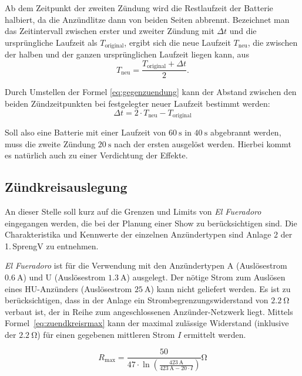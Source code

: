 \documentclass[paper=a4, parskip, numbers=noenddot, toc=listof, headsepline]{scrbook}
\newcommand{\anlage}{\emph{El Fueradoro}}
\begin{document}
			  Ab dem Zeitpunkt der zweiten Zündung wird die Restlaufzeit der Batterie halbiert, da die Anzündlitze dann von beiden Seiten abbrennt. Bezeichnet man das Zeitintervall zwischen erster und zweiter Zündung mit ${\Delta}t$ und die ursprüngliche Laufzeit als $T_\text{original}$, ergibt sich die neue Laufzeit $T_\text{neu}$, die zwischen der halben und der ganzen ursprünglichen Laufzeit liegen kann, aus
			  \begin{equation}
				  T_\text{neu} = \frac{T_\text{original} + {\Delta}t}{2}.
				  \label{eq:gegenzuendung}
			  \end{equation}

			  Durch Umstellen der Formel \eqref{eq:gegenzuendung} kann der Abstand zwischen den beiden Zündzeitpunkten bei festgelegter neuer Laufzeit bestimmt werden:
			  \begin{equation}
				  {\Delta}t = 2 {\cdot} T_\text{neu} - T_\text{original}
			  \end{equation}

			  Soll also eine Batterie mit einer Laufzeit von $\SI{60}{\second}$ in $\SI{40}{\second}$ abgebrannt werden, muss die zweite Zündung $\SI{20}{\second}$ nach der ersten ausgelöst werden. Hierbei kommt es natürlich auch zu einer Verdichtung der Effekte.

		  \subsection{Zündkreisauslegung}

			  An dieser Stelle soll kurz auf die Grenzen und Limits von {\anlage} eingegangen werden, die bei der Planung einer Show zu berücksichtigen sind. Die Charakteristika und Kennwerte der einzelnen Anzündertypen sind Anlage 2 der 1.\,SprengV zu entnehmen.

			  {\anlage} ist für die Verwendung mit den Anzündertypen A (Auslösestrom $\SI{0,6}{\ampere}$) und U (Auslösestrom $\SI{1,3}{\ampere}$) ausgelegt. Der nötige Strom zum Auslösen eines HU-Anzünders (Auslösestrom $\SI{25}{\ampere}$) kann nicht geliefert werden. Es ist zu berücksichtigen, dass in der Anlage ein Strombegrenzungswiderstand von $\SI{2,2}{\ohm}$ verbaut ist, der in Reihe zum angeschlossenen Anzünder-Netzwerk liegt. Mittels Formel~\eqref{eq:zuendkreisrmax} kann der maximal zulässige Widerstand (inklusive der $\SI{2,2}{\ohm}$) für einen gegebenen mittleren Strom $I$ ermittelt werden.

			  \begin{equation}
				  R_\text{max} = \frac{50}{47 {\cdot} \ln\left(\frac{\SI{423}{\ampere}}{\SI{423}{\ampere} - 20 {\cdot} I}\right)}\si{\ohm}
				  \label{eq:zuendkreisrmax}
			  \end{equation}
\end{document}
